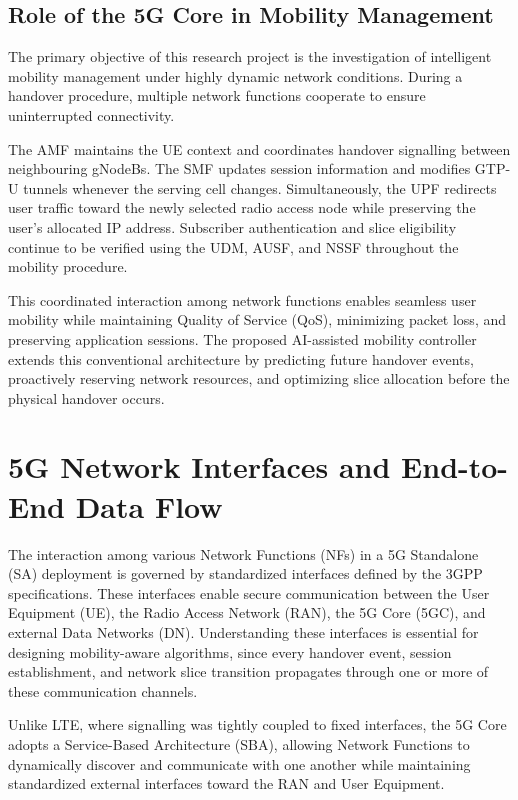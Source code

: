 \documentclass[12pt,a4paper]{article}\usepackage[a4paper,margin=1in]{geometry}\usepackage{graphicx}\usepackage{longtable}\usepackage{booktabs}\usepackage{hyperref}\usepackage{enumitem}\usepackage{amsmath}\usepackage{tikz}\usepackage{pgfgantt}\usepackage{setspace}\setstretch{1.15}\usetikzlibrary{positioning,arrows.meta,shapes.geometric}
\begin{document}
	\vspace{0.4cm}
	
	\subsection{Role of the 5G Core in Mobility Management}
	
	The primary objective of this research project is the investigation of intelligent mobility management under highly dynamic network conditions. During a handover procedure, multiple network functions cooperate to ensure uninterrupted connectivity.
	
	The AMF maintains the UE context and coordinates handover signalling between neighbouring gNodeBs. The SMF updates session information and modifies GTP-U tunnels whenever the serving cell changes. Simultaneously, the UPF redirects user traffic toward the newly selected radio access node while preserving the user's allocated IP address. Subscriber authentication and slice eligibility continue to be verified using the UDM, AUSF, and NSSF throughout the mobility procedure.
	
	This coordinated interaction among network functions enables seamless user mobility while maintaining Quality of Service (QoS), minimizing packet loss, and preserving application sessions. The proposed AI-assisted mobility controller extends this conventional architecture by predicting future handover events, proactively reserving network resources, and optimizing slice allocation before the physical handover occurs.
	
	\section{5G Network Interfaces and End-to-End Data Flow}
	
	The interaction among various Network Functions (NFs) in a 5G Standalone (SA) deployment is governed by standardized interfaces defined by the 3GPP specifications. These interfaces enable secure communication between the User Equipment (UE), the Radio Access Network (RAN), the 5G Core (5GC), and external Data Networks (DN). Understanding these interfaces is essential for designing mobility-aware algorithms, since every handover event, session establishment, and network slice transition propagates through one or more of these communication channels.
	
	Unlike LTE, where signalling was tightly coupled to fixed interfaces, the 5G Core adopts a Service-Based Architecture (SBA), allowing Network Functions to dynamically discover and communicate with one another while maintaining standardized external interfaces toward the RAN and User Equipment.
	
\end{document}
